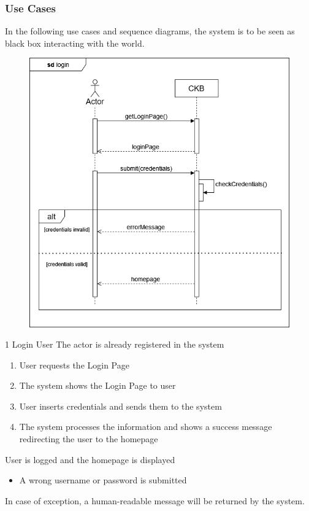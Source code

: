 \subsubsection{Use Cases}
In the following use cases and sequence diagrams, the system is to be seen as black box interacting with the world.
\usecase
{
    \begin{figure}[H]
        \centering
        \includegraphics[width=\textwidth]{src/sequence_diagrams/sqlogin.png}
    \end{figure}
}
{1}
{Login}
{User}
{The actor is already registered in the system}
{
    \begin{enumerate}
        \item User requests the Login Page
        \item The system shows the Login Page to user
        \item User inserts credentials and sends them to the system
        \item The system processes the information and shows a success message redirecting the user to the homepage
    \end{enumerate}
}
{User is logged and the homepage is displayed}
{
    \begin{itemize}
        \item A wrong username or password is submitted
    \end{itemize}
}
{
    In case of exception, a human-readable message will be returned by the system.
}

